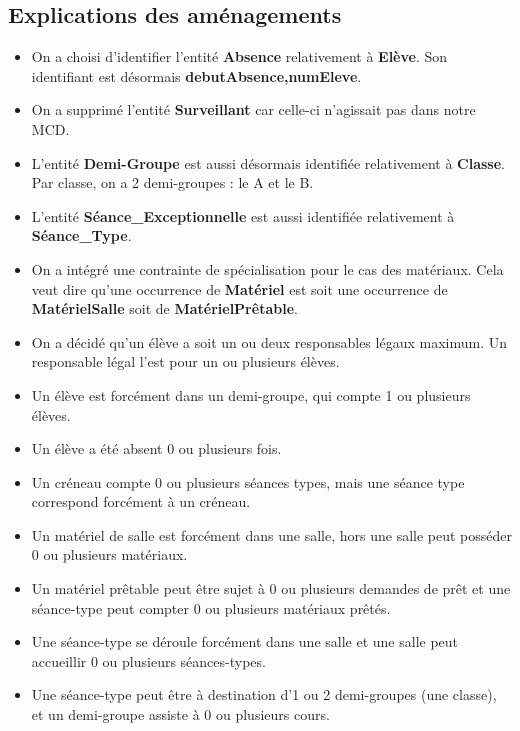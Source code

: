 \documentclass[12pt,french,titlepage]{article}
\begin{document}
	  \subsection{Explications des aménagements}
	  
	  \begin{itemize}
	      \item On a choisi d'identifier l'entité \textbf{Absence} relativement à \textbf{Elève}. Son identifiant est désormais \textbf{debutAbsence,numEleve}. 
	      \item On a supprimé l'entité \textbf{Surveillant }car celle-ci n'agissait pas dans notre MCD.
	      \item L'entité \textbf{Demi-Groupe} est aussi désormais identifiée relativement à \textbf{Classe}. Par classe, on a 2 demi-groupes : le A et le B.
	      \item L'entité \textbf{Séance\_Exceptionnelle} est aussi identifiée relativement à \textbf{Séance\_Type}. 
	      \item On a intégré une contrainte de spécialisation pour le cas des matériaux. Cela veut dire qu'une occurrence de \textbf{Matériel} est soit une occurrence de \textbf{MatérielSalle} soit de \textbf{MatérielPrêtable}.
	      \item On a décidé qu'un élève a soit un ou deux responsables légaux maximum. Un responsable légal l'est pour un ou plusieurs élèves.
	      \item Un élève est forcément dans un demi-groupe, qui compte 1 ou plusieurs élèves.
	      \item Un élève a été absent 0 ou plusieurs fois.
	      \item Un créneau compte 0 ou plusieurs séances types, mais une séance type correspond forcément à un créneau.
	      \item Un matériel de salle est forcément dans une salle, hors une salle peut posséder 0 ou plusieurs matériaux.
	      \item Un matériel prêtable peut être sujet à 0 ou plusieurs demandes de prêt et une séance-type peut compter 0 ou plusieurs matériaux prêtés.
	      \item Une séance-type se déroule forcément dans une salle et une salle peut accueillir 0 ou plusieurs séances-types.
	      \item Une séance-type peut être à destination d'1 ou 2 demi-groupes (une classe), et un demi-groupe assiste à 0 ou plusieurs cours.
	  \end{itemize}
	  
\end{document}
